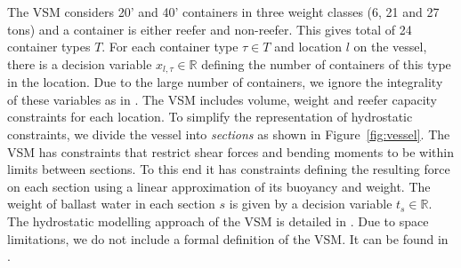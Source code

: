 \documentclass{llncs}
\begin{document}
The VSM considers 20' and 40' containers in three weight classes (6, 21 and 27 tons) and a container is either reefer and non-reefer. This gives total of 24 container types $T$. For each container type $\tau \in T$ and location $l$ on the vessel, there is a decision variable $x_{l,\tau} \in \mathbb{R}$ defining the number of containers of this type in the location. Due to the large number of containers, we ignore the integrality of these variables as in \cite{pacino11}. The VSM includes volume, weight and reefer capacity constraints for each location. To simplify the representation of hydrostatic constraints, we divide the vessel into \emph{sections} as shown in Figure~\ref{fig:vessel}. The VSM has constraints that restrict shear forces and bending moments to be within limits between sections. To this end it has constraints defining the resulting force on each section using a linear approximation of its buoyancy and weight. The weight of ballast water in each section $s$ is given by a decision variable $t_s \in \mathbb{R}$. The hydrostatic modelling approach of the VSM is detailed in \cite{ICCL18}. Due to space limitations, we do not include a formal definition of the VSM. It can be found in \cite{mytechrep}. 
\end{document}
